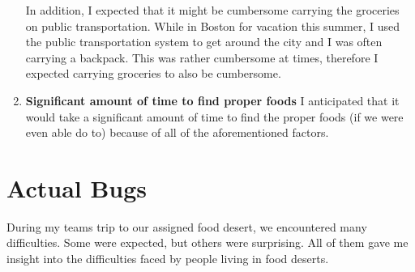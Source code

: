 \documentclass[11pt]{article}
\begin{document}
\begin{enumerate}
        In addition, I expected that it might be cumbersome carrying the groceries on public
        transportation. While in Boston for vacation this summer, I used the public transportation
        system to get around the city and I was often carrying a backpack. This was rather
        cumbersome at times, therefore I expected carrying groceries to also be cumbersome.

    \item \textbf{Significant amount of time to find proper foods} I anticipated that it would take
        a significant amount of time to find the proper foods (if we were even able do to) because
        of all of the aforementioned factors.
\end{enumerate}

\section{Actual Bugs}
During my teams trip to our assigned food desert, we encountered many difficulties. Some were
expected, but others were surprising. All of them gave me insight into the difficulties faced by
people living in food deserts.
\end{document}
